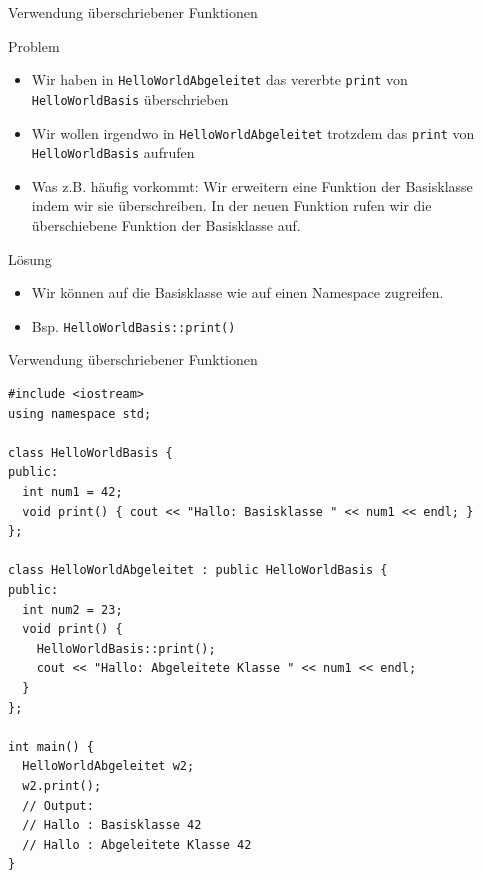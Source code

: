 \documentclass[presentation]{beamer}
\begin{document}
\begin{frame}[fragile,label={sec:org4d20921}]{Verwendung überschriebener Funktionen}
 \begin{block}{Problem}
\begin{itemize}
\item Wir haben in {\color{solarizedYellow}\texttt{HelloWorldAbgeleitet} }das vererbte {\color{solarizedYellow}\texttt{print} }von
{\color{solarizedYellow}\texttt{HelloWorldBasis} }überschrieben
\item Wir wollen irgendwo in {\color{solarizedYellow}\texttt{HelloWorldAbgeleitet} }trotzdem das {\color{solarizedYellow}\texttt{print}}
von {\color{solarizedYellow}\texttt{HelloWorldBasis} }aufrufen
\item Was z.B. häufig vorkommt: Wir erweitern eine Funktion der
Basisklasse indem wir sie überschreiben. In der neuen Funktion rufen
wir die überschiebene Funktion der Basisklasse auf.
\end{itemize}
\end{block}
\begin{block}{Lösung}
\begin{itemize}
\item \alert{Wir können auf die Basisklasse wie auf einen Namespace zugreifen.}
\item Bsp. {\color{solarizedYellow}\texttt{HelloWorldBasis::print()}}
\end{itemize}
\end{block}
\end{frame}
\begin{frame}[fragile,label={sec:orgd4d7f39}]{Verwendung überschriebener Funktionen}
 \begin{verbatim}
#include <iostream>
using namespace std;

class HelloWorldBasis {
public:
  int num1 = 42;
  void print() { cout << "Hallo: Basisklasse " << num1 << endl; }
};

class HelloWorldAbgeleitet : public HelloWorldBasis {
public:
  int num2 = 23;
  void print() {
    HelloWorldBasis::print();
    cout << "Hallo: Abgeleitete Klasse " << num1 << endl;
  }
};

int main() {
  HelloWorldAbgeleitet w2;
  w2.print();
  // Output:
  // Hallo : Basisklasse 42
  // Hallo : Abgeleitete Klasse 42
}
\end{verbatim}
\end{frame}
\end{document}
